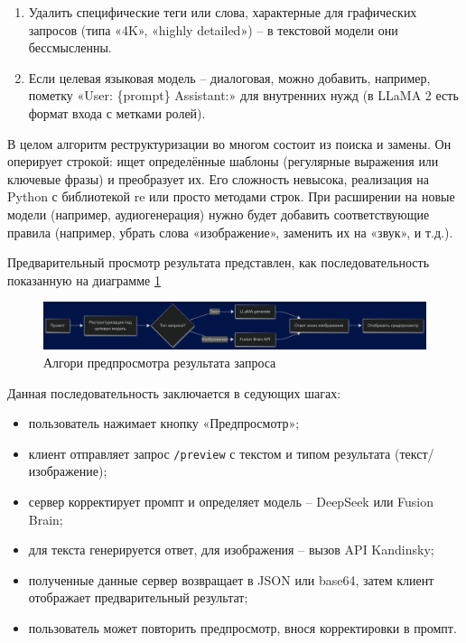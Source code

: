 \begin{enumerate}[label=\arabic*]
\begin{enumerate}[label=2.\arabic*]
        \item Удалить специфические теги или слова, характерные для графических запросов (типа «4K», «highly detailed») – в текстовой модели они бессмысленны.
        \item Если целевая языковая модель – диалоговая, можно добавить, например, пометку «User: \{prompt\} Assistant:» для внутренних нужд (в LLaMA 2 есть формат входа с метками ролей).
    \end{enumerate}
\end{enumerate}
В целом алгоритм реструктуризации во многом состоит из поиска и замены. Он оперирует строкой: ищет определённые шаблоны (регулярные выражения или ключевые фразы) и преобразует их. Его сложность невысока, реализация на Python с библиотекой re или просто методами строк. При расширении на новые модели (например, аудиогенерация) нужно будет добавить соответствующие правила (например, убрать слова «изображение», заменить их на «звук», и т.д.).

Предварительный просмотр результата представлен, как последовательность показанную на диаграмме \ref{algo-3}
\begin{figure}[htbp]
    \centering
    \includegraphics[width=1\textwidth]{picture/diploma-inter-algo-3.png}
    \caption{Алгори предпросмотра  результата запроса}
    \label{algo-3}
\end{figure}


Данная последовательность заключается в седующих шагах:
\begin{itemize}
    \item пользователь нажимает кнопку «Предпросмотр»;
    \item клиент отправляет запрос \texttt{/preview} с текстом и типом результата (текст/изображение);
    \item сервер корректирует промпт и определяет модель – DeepSeek или Fusion Brain;
    \item для текста генерируется ответ, для изображения – вызов API Kandinsky;
    \item полученные данные сервер возвращает в JSON или base64, затем клиент отображает предварительный результат;
    \item пользователь может повторить предпросмотр, внося корректировки в промпт.
\end{itemize}

